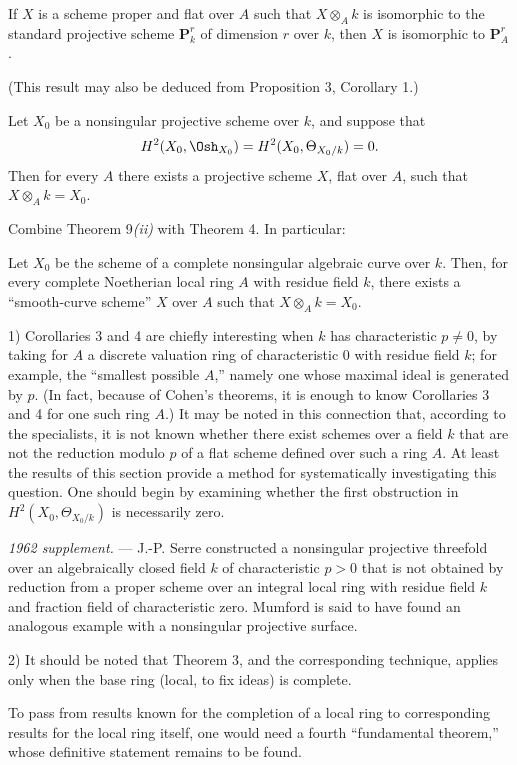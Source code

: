  If $X$ is a scheme proper and flat over $A$ such that
$X\otimes_A k$ is isomorphic to the standard projective scheme
$\mathbf P_k^r$ of dimension $r$ over $k$, then $X$ is isomorphic to
$\mathbf P_A^r$.

(This result may also be deduced from Proposition 3, Corollary 1.)

 Let $X_0$ be a nonsingular projective scheme over $k$,
and suppose that
\[
  H^2(X_0,\Osh_{X_0})=H^2(X_0,\Theta_{X_0/k})=0.
\]
Then for every $A$ there exists a projective scheme $X$, flat over $A$, such
that $X\otimes_A k=X_0$.

Combine Theorem 9\textit{(ii)} with Theorem 4. In particular:

 Let $X_0$ be the scheme of a complete nonsingular
algebraic curve over $k$. Then, for every complete Noetherian local ring $A$
with residue field $k$, there exists a “smooth-curve scheme” $X$ over $A$ such
that $X\otimes_A k=X_0$.


1) Corollaries 3 and 4 are chiefly interesting when $k$ has characteristic
$p\ne0$, by taking for $A$ a discrete valuation ring of characteristic $0$
with residue field $k$; for example, the “smallest possible $A$,” namely one
whose maximal ideal is generated by $p$. (In fact, because of Cohen's
theorems, it is enough to know Corollaries 3 and 4 for one such ring $A$.) It
may be noted in this connection that, according to the specialists, it is not
known whether there exist schemes over a field $k$ that are not the reduction
modulo $p$ of a flat scheme defined over such a ring $A$. At least the results
of this section provide a method for systematically investigating this
question. One should begin
by examining whether the first obstruction in $H^2(X_0,\Theta_{X_0/k})$ is
necessarily zero.

\emph{1962 supplement.} --- J.-P. Serre constructed a nonsingular projective
threefold over an algebraically closed field $k$ of characteristic $p>0$ that
is not obtained by reduction from a proper scheme over an integral local ring
with residue field $k$ and fraction field of characteristic zero. Mumford is
said to have found an analogous example with a nonsingular projective surface.

2) It should be noted that Theorem 3, and the corresponding technique, applies
only when the base ring (local, to fix ideas) is complete.

To pass from results known for the completion of a local ring to corresponding
results for the local ring itself, one would need a fourth “fundamental
theorem,” whose definitive statement remains to be found.

